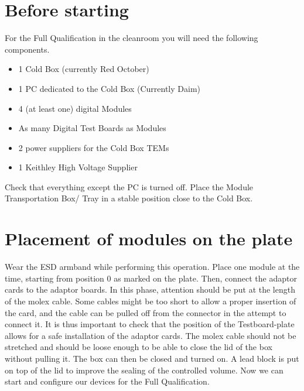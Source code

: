 \documentclass[fleqn,10pt]{SelfArx} %
\date{\today}
\begin{document}
\flushbottom %

\maketitle %

\tableofcontents %

\thispagestyle{empty} %


\section{Before starting}
For the Full Qualification in the cleanroom you will need the following components.
\begin{itemize}
\item 1 Cold Box (currently Red October)
\item 1 PC dedicated to the Cold Box (Currently Daim)
\item 4 (at least one) digital Modules
\item As many Digital Test Boards as Modules
\item 2 power suppliers for the Cold Box TEMs 
\item 1 Keithley High Voltage Supplier
\end{itemize}
Check that everything except the PC is turned off. Place the Module Transportation Box/ Tray in a stable position close to the Cold Box.


\section{Placement of modules on the plate}
Wear the ESD armband while performing this operation. Place one module at the time, starting from position 0 as marked on the plate. Then, connect the adaptor cards to the adaptor boards. In this phase, attention should be put at the length of the molex cable. Some cables might be too short to allow a proper insertion of the card, and the cable can be pulled off from the connector in the attempt to connect it. It is thus important to check that the position of the Testboard-plate allows for a safe installation of the adaptor cards. The molex cable should not be stretched and should be loose enough to be able to close the lid of the box without pulling it. The box can then be closed and turned on. A lead block is put on top of the lid to improve the sealing of the controlled volume. Now we can start and configure our devices for the Full Qualification.
\end{document}

